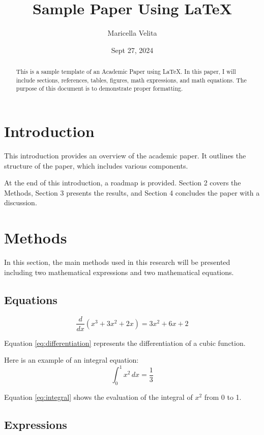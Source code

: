 \documentclass[11pt, oneside]{article}   	%
\title{Sample Paper Using LaTeX}
\author{Maricella Velita}
\date{Sept 27, 2024}
\begin{document}
\maketitle

\begin{abstract}
This is a sample template of an Academic Paper using LaTeX. In this paper, I will include sections, references, tables, figures, math expressions, and math equations. The purpose of this document is to demonstrate proper formatting.
\end{abstract}

\section{Introduction}
This introduction provides an overview of the academic paper. It outlines the structure of the paper, which includes various components. 

At the end of this introduction, a roadmap is provided. Section 2 covers the Methods, Section 3 presents the results, and Section 4 concludes the paper with a discussion.

\section{Methods}
In this section, the main methods used in this research will be presented including two mathematical expressions and two mathematical equations.

\subsection{Equations}

\begin{equation}
	\frac{d}{dx}  \left(  x^3  +  3x^2  +  2x \right) = 3x^2  +  6x  +  2
	\label{eq:differentiation}  
\end{equation}

Equation \ref{eq:differentiation} represents the differentiation of a cubic function.

Here is an example of an integral equation:
\begin{equation}
 	\int_0^1  x^2 \,  dx = \frac{1}{3}
	\label{eq:integral}
\end{equation}

Equation \ref{eq:integral} shows the evaluation of the integral of \(x^2\) from 0 to 1.

\subsection{Expressions}
\end{document}
